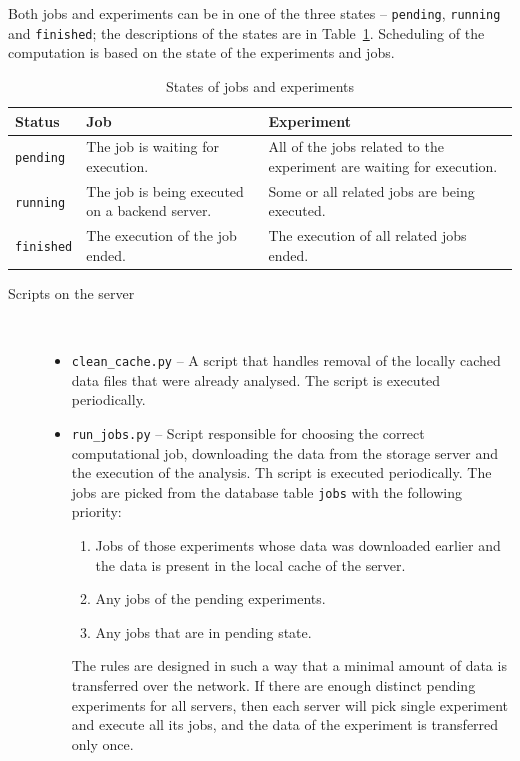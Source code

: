 \documentclass[
	digital,    %
	oneside,    %
	color,
	11pt,
	nocover,
	notable,
	nolof,
	nolot,
]{fithesis3}
\newenvironment{titlemize}[1]
{
	\begin{description}
	\item[#1]\
	\begin{itemize}
}
{
	\end{itemize}
 	\end{description}
}
\theoremstyle{definition}
\theoremstyle{remark}
\begin{document}
Both jobs and experiments can be in one of the three states -- \texttt{pending}, \texttt{running} and \texttt{finished}; the descriptions of the states are in Table~\ref{tab:states_jobs_exps}. Scheduling of the computation is based on the state of the experiments and jobs.

\begin{table}[H]
\begin{nomar}
\centering
\begin{tabular}{@{}lp{6cm}p{6cm}@{}} \toprule
\textbf{Status}   & \textbf{Job} & \textbf{Experiment} \\ \midrule
\texttt{pending}  & The job is waiting for execution. & All of the jobs related to the experiment are waiting for execution. \\ 
\texttt{running}  & The job is being executed on a backend server. & Some or all related jobs are being executed. \\ 
\texttt{finished} & The execution of the job ended. & The execution of all related jobs ended. \\ \bottomrule
\end{tabular}
\end{nomar}
\caption{States of jobs and experiments}
\label{tab:states_jobs_exps}
\end{table}

\begin{titlemize}{Scripts on the server}
\item \texttt{clean\_cache.py} -- A script that handles removal of the locally cached data files that were already analysed. The script is executed periodically.
\item \texttt{run\_jobs.py} -- Script responsible for choosing the correct computational job, downloading the data from the storage server and the execution of the analysis. Th script is executed periodically. The jobs are picked from the database table \texttt{jobs} with the following priority:
\begin{enumerate}
\item Jobs of those experiments whose data was downloaded earlier and the data is present in the local cache of the server.
\item Any jobs of the pending experiments.
\item Any jobs that are in pending state.
\end{enumerate}
The rules are designed in such a way that a minimal amount of data is transferred over the network. If there are enough distinct pending experiments for all servers, then each server will pick single experiment and execute all its jobs, and the data of the experiment is transferred only once.
\end{titlemize}
\end{document}

